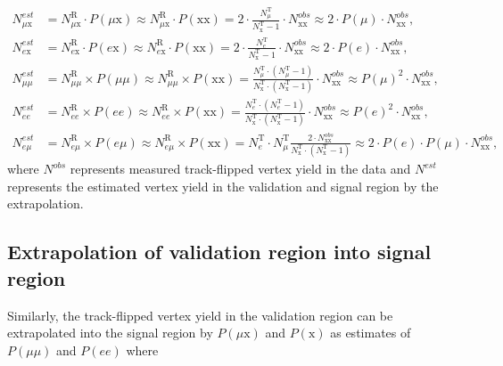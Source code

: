 \begin{align}
\label{eq:TF_extrapolation_from_control}
N_{\mu \mathrm{x}}^{est} &= N^{\mathrm{R}}_{\mu \mathrm{x}} \cdot P(\mu \mathrm{x}) \approx N^{\mathrm{R}}_{\mu \mathrm{x}} \cdot P(\mathrm{xx})    = 2 \cdot \frac{N^{\mathrm{T}}_{\mu}}{N^{\mathrm{T}}_{\mathrm{x}} -1} \cdot N_{\mathrm{xx}}^{obs} \approx 2 \cdot P(\mu) \cdot N_{\mathrm{xx}}^{obs},\nonumber\\
N_{e \mathrm{x}}^{est}   &= N^{\mathrm{R}}_{e \mathrm{x}} \cdot P(e\mathrm{x}) \approx N^{\mathrm{R}}_{e \mathrm{x}} \cdot P(\mathrm{xx})      = 2 \cdot \frac{N^{\mathrm{T}}_{e}}{N^{\mathrm{T}}_{\mathrm{x}} -1} \cdot N_{\mathrm{xx}}^{obs} \approx 2 \cdot P(e) \cdot N_{\mathrm{xx}}^{obs}, \nonumber \\
N_{\mu\mu}^{est}&= N^{\mathrm{R}}_{\mu\mu} \times P(\mu\mu) \approx N^{\mathrm{R}}_{\mu\mu} \times P(\mathrm{xx})  = \frac{N^{\mathrm{T}}_{\mu}\cdot(N^{\mathrm{T}}_{\mu} - 1)}{N^{\mathrm{T}}_{\mathrm{x}}\cdot(N^{\mathrm{T}}_{\mathrm{x}}-1)} \cdot N_{\mathrm{xx}}^{obs} \approx P(\mu)^{2} \cdot N_{\mathrm{xx}}^{obs}, \nonumber \\
N_{ee}^{est}    &= N^{\mathrm{R}}_{ee} \times P(ee) \approx N^{\mathrm{R}}_{ee} \times P(\mathrm{xx}) 		= \frac{N^{\mathrm{T}}_{e}\cdot(N^{\mathrm{T}}_{e} - 1)}{N^{\mathrm{T}}_{\mathrm{x}}\cdot(N^{\mathrm{T}}_{\mathrm{x}}-1)} \cdot N_{\mathrm{xx}}^{obs} \approx P(e)^{2} \cdot N_{\mathrm{xx}}^{obs}, \nonumber \\
N_{e \mu}^{est} &= N^{\mathrm{R}}_{e \mu} \times P(e \mu) \approx N^{\mathrm{R}}_{e \mu} \times P(\mathrm{xx}) 	= N^{\mathrm{T}}_{e} \cdot N^{\mathrm{T}}_{\mu} \frac{2 \cdot N_{\mathrm{xx}}^{obs}}{N^{\mathrm{T}}_{\mathrm{x}} \cdot (N^{\mathrm{T}}_{\mathrm{x}}-1)} \approx 2\cdot P(e)\cdot P(\mu) \cdot N_{\mathrm{xx}}^{obs},
\end{align}
%
where $N^{obs}$ represents measured track-flipped vertex yield in the data and $N^{est}$ represents the estimated vertex yield in the validation and signal region by the extrapolation.

\subsection{Extrapolation of validation region into signal region}

Similarly, the track-flipped vertex yield in the validation region can be extrapolated into the signal region by $P(\mu\mathrm{x})$ and $P(\mathrm{x})$ as estimates of $P(\mu\mu)$ and $P(ee)$ where

